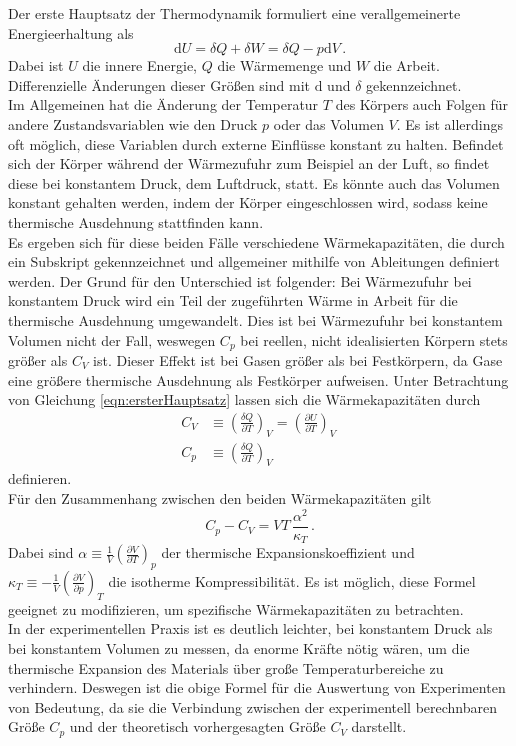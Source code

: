 Der erste Hauptsatz der Thermodynamik formuliert eine verallgemeinerte Energieerhaltung als
\begin{equation}
  \text{d}U = \delta Q + \delta W = \delta Q - p \text{d}V\,.
  \label{eqn:ersterHauptsatz}
\end{equation}
Dabei ist $U$ die innere Energie, $Q$ die Wärmemenge und $W$ die Arbeit. Differenzielle Änderungen dieser Größen sind mit $\text{d}$ und $\delta$ gekennzeichnet.\\
Im Allgemeinen hat die Änderung der Temperatur $T$ des Körpers auch Folgen für andere Zustandsvariablen wie den Druck $p$ oder das Volumen $V$. Es ist allerdings oft möglich, diese Variablen durch externe Einflüsse konstant zu halten. Befindet sich der Körper während der Wärmezufuhr zum Beispiel an der Luft, so findet diese bei konstantem Druck, dem Luftdruck, statt. Es könnte auch das Volumen konstant gehalten werden, indem der Körper eingeschlossen wird, sodass keine thermische Ausdehnung stattfinden kann.\\
Es ergeben sich für diese beiden Fälle verschiedene Wärmekapazitäten, die durch ein Subskript gekennzeichnet und allgemeiner mithilfe von Ableitungen definiert werden. Der Grund für den Unterschied ist folgender: Bei Wärmezufuhr bei konstantem Druck wird ein Teil der zugeführten Wärme in Arbeit für die thermische Ausdehnung umgewandelt. Dies ist bei Wärmezufuhr bei konstantem Volumen nicht der Fall, weswegen $C_p$ bei reellen, nicht idealisierten Körpern stets größer als $C_V$ ist. Dieser Effekt ist bei Gasen größer als bei Festkörpern, da Gase eine größere thermische Ausdehnung als Festkörper aufweisen.
Unter Betrachtung von Gleichung \ref{eqn:ersterHauptsatz} lassen sich die Wärmekapazitäten durch
\begin{align}
  C_V &\equiv \left(\frac{\delta Q}{\partial T}\right)_V = \left(\frac{\partial U}{\partial T}\right)_V\, \label{eqn:C_V}\\
  C_p &\equiv \left(\frac{\delta Q}{\partial T}\right)_V \label{eqn:C_p}
\end{align}
definieren.\\
Für den Zusammenhang zwischen den beiden Wärmekapazitäten gilt
\begin{equation}
  C_p - C_V = V T \, \frac{\alpha^2}{\kappa_T}\,.
  \label{eqn:CpminusCV}
\end{equation}
Dabei sind $\alpha \equiv \frac{1}{V}\left(\frac{\partial V}{\partial T}\right)_p$ der thermische Expansionskoeffizient und $\kappa_T \equiv - \frac{1}{V}\left(\frac{\partial V}{\partial p}\right)_T$ die isotherme Kompressibilität. Es ist möglich, diese Formel geeignet zu modifizieren, um spezifische Wärmekapazitäten zu betrachten.\\
In der experimentellen Praxis ist es deutlich leichter, bei konstantem Druck als bei konstantem Volumen zu messen, da enorme Kräfte nötig wären, um die thermische Expansion des Materials über große Temperaturbereiche zu verhindern. Deswegen ist die obige Formel für die Auswertung von Experimenten von Bedeutung, da sie die Verbindung zwischen der experimentell berechnbaren Größe $C_p$ und der theoretisch vorhergesagten Größe $C_V$ darstellt.

